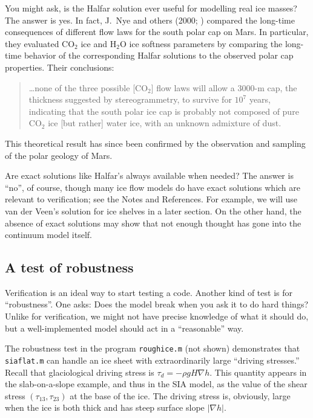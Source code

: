 \documentclass[letterpaper,final,12pt,reqno]{amsart}
\newcommand{\grad}{\nabla}
\begin{document}
You might ask, is the Halfar solution ever useful for modelling real ice masses?  The answer is yes.  In fact, J.~Nye and others (2000; \cite{NyeIcarus2000}) compared the long-time consequences of different flow laws for the south polar cap on Mars.  In particular, they evaluated $\text{CO}_2$ ice and $\text{H}_2\text{O}$ ice softness parameters by comparing the long-time behavior of the corresponding Halfar solutions to the observed polar cap properties.  Their conclusions:
  \begin{quote}
  \dots none of the three possible [$\text{CO}_2$] flow laws will allow a 3000-m cap, the thickness suggested by stereogrammetry, to survive for $10^7$ years, indicating that the south polar ice cap is probably not composed of pure $\text{CO}_2$ ice [but rather] water ice, with an unknown admixture of dust.
  \end{quote}
This theoretical result has since been confirmed by the observation and sampling of the polar geology of Mars.

Are exact solutions like Halfar's always available when needed?  The answer is ``no'', of course, though many ice flow models do have exact solutions which are relevant to verification; see the Notes and References.  For example, we will use van der Veen's solution for ice shelves in a later section.  On the other hand, the absence of exact solutions may show that not enough thought has gone into the continuum model itself.

\subsection*{A test of robustness}  Verification is an ideal way to start testing a code.  Another kind of test is for ``robustness''.  One asks: Does the model break when you ask it to do hard things?  Unlike for verification, we might not have precise knowledge of what it should do, but a well-implemented model should act in a ``reasonable'' way.

The robustness test in the program \texttt{roughice.m} (not shown) demonstrates that \texttt{siaflat.m} can handle an ice sheet with extraordinarily large ``driving stresses.''  Recall that glaciological driving stress is $\tau_d = - \rho g H \grad h$.  This quantity appears in the slab-on-a-slope example, and thus in the SIA model, as the value of the shear stress $(\tau_{13},\tau_{23})$ at the base of the ice.  The driving stress is, obviously, large when the ice is both thick and has steep surface slope $|\nabla h|$.
\end{document}
